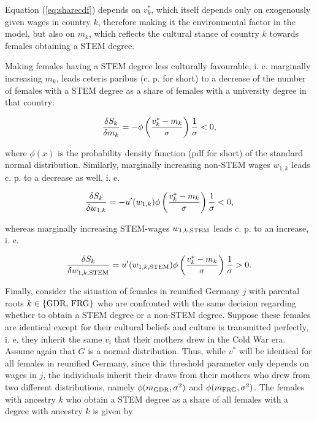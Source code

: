 \documentclass[a4paper, oneside, hyperfootnotes = false]{article}
\begin{document}
{\noindent Equation (\ref{eq:sharecdf}) depends on $v^{*}_{k}$, which itself depends only on exogenously given wages in country $k$, therefore making it the environmental factor in the model, but also on $m_{k}$, which reflects the cultural stance of country $k$ towards females obtaining a STEM degree.

Making females having a STEM degree less culturally favourable, i. e. marginally increasing $m_{k}$, leads ceteris paribus (c. p. for short) to a decrease of the number of females with a STEM degree as a share of females with a university degree in that country:

\vspace{-8mm}

\begin{equation*}
	\label{eq:derivmk}
	\frac{\delta{}S_{k}}{\delta{}m_{k}} = -\phi\left(\frac{v^{*}_{k} - m_{k}}{\sigma}\right)\frac{1}{\sigma} < 0\textnormal{,}
\end{equation*}

\noindent where $\phi(x)$ is the probability density function (pdf for short) of the standard normal distribution. Similarly, marginally increasing non-STEM wages $w_{1,k}$ leads c. p. to a decrease as well, i. e.

\vspace{-8mm}

\begin{equation*}
\label{eq:derivw1k}
\frac{\delta{}S_{k}}{\delta{}w_{1,k}} = -u'(w_{1,k})\phi\left(\frac{v^{*}_{k} - m_{k}}{\sigma}\right)\frac{1}{\sigma} < 0\textnormal{,}
\end{equation*}

\noindent whereas marginally increasing STEM-wages $w_{1,k,\textnormal{STEM}}$ leads c. p. to an increase, i. e.

\vspace{-8mm}

\begin{equation*}
	\label{eq:derivw1kstem}
	\frac{\delta{}S_{k}}{\delta{}w_{1,k,\textnormal{STEM}}} = u'(w_{1,k,\textnormal{STEM}})\phi\left(\frac{v^{*}_{k} - m_{k}}{\sigma}\right)\frac{1}{\sigma} > 0\textnormal{.}
\end{equation*}

Finally, consider the situation of females in reunified Germany $j$ with parental roots $k \in \{\textnormal{GDR, FRG}\}$ who are confronted with the same decision regarding whether to obtain a STEM degree or a non-STEM degree. Suppose these females are identical except for their cultural beliefs and culture is transmitted perfectly, i. e. they inherit the same $v_{i}$ that their mothers drew in the Cold War era.
Assume again that $G$ is a normal distribution.
Thus, while $v^{*}$ will be identical for all females in reunified Germany, since this threshold parameter only depends on wages in $j$, the individuals inherit their draws from their mothers who drew from two different distributions, namely $\phi(m_{\textnormal{GDR}},\sigma^{2})$ and $\phi(m_{\textnormal{FRG}},\sigma^{2})$.
The females with ancestry $k$ who obtain a STEM degree as a share of all females with a degree with ancestry $k$ is given by

}
\end{document}
